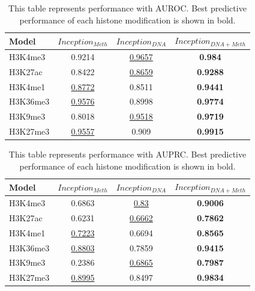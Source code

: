 \begin{table}[H]%
    \centering
    \begin{tabular}{lccc}
    \hline
    Model & $Inception_{Meth}$ & $Inception_{DNA}$ & $Inception_{DNA+Meth}$ \\\hline
    H3K4me3 & 0.9214 & \underline{0.9657} & \textbf{0.984} \\
    H3K27ac & 0.8422 & \underline{0.8659} & \textbf{0.9288} \\
    H3K4me1 & \underline{0.8772} & 0.8511 & \textbf{0.9441} \\
    H3K36me3 & \underline{0.9576} & 0.8998 & \textbf{0.9774} \\
    H3K9me3 & 0.8018 & \underline{0.9518} & \textbf{0.9719} \\
    H3K27me3 & \underline{0.9557} & 0.909 & \textbf{0.9915} \\\hline
    \end{tabular}
    \captionsetup{labelfont=bf}
    \renewcommand{\baselinestretch}{1.0}
    \caption[Comparison of different inputs across cell lines with AUROC]{This table represents performance with AUROC. Best predictive performance of each histone modification is shown in bold.}
    \label{t10}
\end{table}

\begin{table}[H]%
    \centering
    \begin{tabular}{lccc}
    \hline
    Model & $Inception_{Meth}$ & $Inception_{DNA}$ & $Inception_{DNA+Meth}$ \\\hline
    H3K4me3 & 0.6863 & \underline{0.83} & \textbf{0.9006} \\
    H3K27ac & 0.6231 & \underline{0.6662} & \textbf{0.7862} \\
    H3K4me1 & \underline{0.7223} & 0.6694 & \textbf{0.8565} \\
    H3K36me3 & \underline{0.8803} & 0.7859 & \textbf{0.9415} \\
    H3K9me3 & 0.2386 & \underline{0.6865} & \textbf{0.7987} \\
    H3K27me3 & \underline{0.8995} & 0.8497 & \textbf{0.9834} \\\hline
    \end{tabular}
    \captionsetup{labelfont=bf}
    \renewcommand{\baselinestretch}{1.0}
    \caption[Comparison of different inputs across cell lines with AUPRC]{This table represents performance with AUPRC. Best predictive performance of each histone modification is shown in bold.}
    \label{t11}
\end{table}

